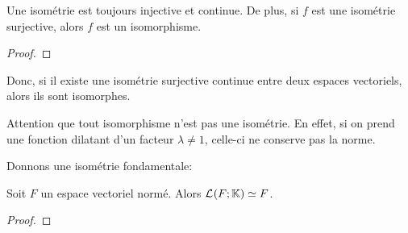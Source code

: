 \begin{proposition}
	Une isométrie est toujours injective et continue. De plus, si $f$ est une
	isométrie surjective, alors $f$ est un isomorphisme.
\end{proposition}

\ifdefined\outputproof
\begin{proof}

\end{proof}
\fi

Donc, si il existe une isométrie surjective continue entre deux espaces
vectoriels, alors ils sont isomorphes.

Attention que tout isomorphisme n'est pas une isométrie. En effet, si on prend
une fonction dilatant d'un facteur $\lambda \neq 1$, celle-ci ne conserve pas la
norme.

Donnons une isométrie fondamentale:

\begin{proposition}
	Soit $F$ un espace vectoriel normé. Alors $\mathcal{L}_{}(F; \mathbb{K})
	\simeq F$.
\end{proposition}

\ifdefined\outproof
\begin{proof}

\end{proof}
\fi
